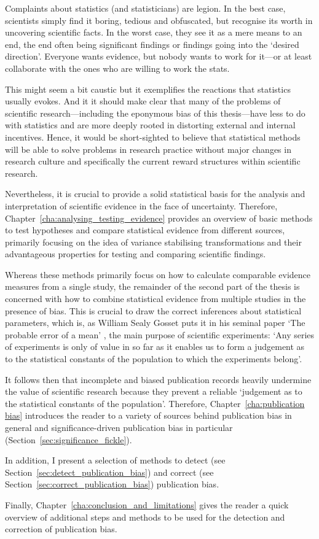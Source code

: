 Complaints about statistics (and statisticians) are legion. In the best case, scientists simply find it boring, tedious and obfuscated, but recognise its worth in uncovering scientific facts. In the worst case, they see it as a mere means to an end, the end often being significant findings or findings going into the `desired direction'. Everyone wants evidence, but nobody wants to work for it---or at least collaborate with the ones who are willing to work the stats.\par
This might seem a bit caustic but it exemplifies the reactions that statistics usually evokes. And it it should make clear that many of the problems of scientific research---including the eponymous bias of this thesis---have less to do with statistics and are more deeply rooted in distorting external and internal incentives. Hence, it would be short-sighted to believe that statistical methods will be able to solve problems in research practice without major changes in research culture and specifically the current reward structures within scientific research.\par
Nevertheless, it is crucial to provide a solid statistical basis for the analysis and interpretation of scientific evidence in the face of uncertainty. Therefore, Chapter~\ref{cha:analysing_testing_evidence} provides an overview of basic methods to test hypotheses and compare statistical evidence from different sources, primarily focusing on the idea of variance stabilising transformations and their advantageous properties for testing and comparing scientific findings.\par
Whereas these methods primarily focus on how to calculate comparable evidence measures from a single study, the remainder of the second part of the thesis is concerned with how to combine statistical evidence from multiple studies in the presence of bias. This is crucial to draw the correct inferences about statistical parameters, which is, as William Sealy Gosset puts it in his seminal paper `The probable error of a mean' \citep[p.~1]{student_probable_1908}, the main purpose of scientific experiments: `Any series of experiments is only of value in so far as it enables us to form a judgement as to the statistical constants of the population to which the experiments belong'.\par
It follows then that incomplete and biased publication records heavily undermine the value of scientific research because they prevent a reliable `judgement as to the statistical constants of the population'. Therefore, Chapter~\ref{cha:publication bias} introduces the reader to a variety of sources behind publication bias in general and significance-driven publication bias in particular (Section~\ref{sec:significance_fickle}).\par
In addition, I present a selection of methods to detect (see Section~\ref{sec:detect_publication_bias}) and correct (see Section~\ref{sec:correct_publication_bias}) publication bias.\par
Finally, Chapter~\ref{cha:conclusion_and_limitations} gives the reader a quick overview of additional steps and methods to be used for the detection and correction of publication bias.